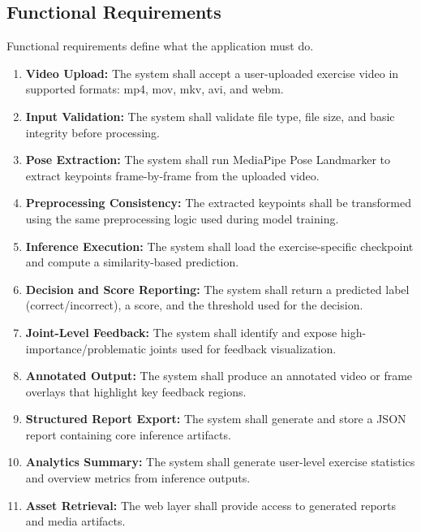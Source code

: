 \subsection{Functional Requirements}
Functional requirements define what the application must do.
\begin{enumerate}
    \item \textbf{Video Upload:} The system shall accept a user-uploaded exercise video in supported formats: mp4, mov, mkv, avi, and webm.
    \item \textbf{Input Validation:} The system shall validate file type, file size, and basic integrity before processing.
    \item \textbf{Pose Extraction:} The system shall run MediaPipe Pose Landmarker to extract keypoints frame-by-frame from the uploaded video.
    \item \textbf{Preprocessing Consistency:} The extracted keypoints shall be transformed using the same preprocessing logic used during model training.
    \item \textbf{Inference Execution:} The system shall load the exercise-specific checkpoint and compute a similarity-based prediction.
    \item \textbf{Decision and Score Reporting:} The system shall return a predicted label (correct/incorrect), a score, and the threshold used for the decision.
    \item \textbf{Joint-Level Feedback:} The system shall identify and expose high-importance/problematic joints used for feedback visualization.
    \item \textbf{Annotated Output:} The system shall produce an annotated video or frame overlays that highlight key feedback regions.
    \item \textbf{Structured Report Export:} The system shall generate and store a JSON report containing core inference artifacts.
    \item \textbf{Analytics Summary:} The system shall generate user-level exercise statistics and overview metrics from inference outputs.
    \item \textbf{Asset Retrieval:} The web layer shall provide access to generated reports and media artifacts.
\end{enumerate}

